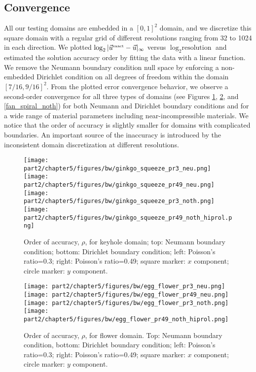 \subsection{Convergence} \label{subsec:ch5.examples.convergence}

All our testing domains are embedded in a $[0,1]^2$ domain, and we discretize this square domain with a regular grid of different resolutions ranging from 32 to 1024 in each direction. We plotted $\log_2 |\vec u^{\mbox{\tiny{exact}}}-\vec u|_{\infty}$ versus $\log_2 \mbox{resolution}$ and estimated the solution accuracy order by fitting the data with a linear function. We remove the Neumann boundary condition null space by enforcing a non-embedded Dirichlet condition on all degrees of freedom within the domain $[7/16,9/16]^2$. From the plotted error convergence behavior, we observe a second-order convergence for all three types of domains (see Figures \ref{ginkgo_squeeze_noth}, \ref{egg_flower_noth}, and \ref{fan_spiral_noth}) for both Neumann and Dirichlet boundary conditions and for a wide range of material parameters including near-incompressible materials. We notice that the order of accuracy is slightly smaller for domains with complicated boundaries. An important source of the inaccuracy is introduced by the inconsistent domain discretization at different resolutions.

\begin{figure}[ht]\centering
\texttt{[image: part2/chapter5/figures/bw/ginkgo\_squeeze\_pr3\_neu.png]}
\texttt{[image: part2/chapter5/figures/bw/ginkgo\_squeeze\_pr49\_neu.png]}
\texttt{[image: part2/chapter5/figures/bw/ginkgo\_squeeze\_pr3\_noth.png]}
\texttt{[image: part2/chapter5/figures/bw/ginkgo\_squeeze\_pr49\_noth\_hiprol.png]}
\vspace*{-.05in}
\caption{Order of accuracy, $\rho$, for keyhole domain; top: Neumann boundary condition; bottom: Dirichlet boundary condition; left: Poisson's ratio=0.3; right: Poisson's ratio=0.49; square marker: $x$ component; circle marker: $y$ component. }
\vspace*{-.07in}
\label{ginkgo_squeeze_noth}
\end{figure}

\begin{figure}[h!]\centering
\texttt{[image: part2/chapter5/figures/bw/egg\_flower\_pr3\_neu.png]}
\texttt{[image: part2/chapter5/figures/bw/egg\_flower\_pr49\_neu.png]}
\texttt{[image: part2/chapter5/figures/bw/egg\_flower\_pr3\_noth.png]}
\texttt{[image: part2/chapter5/figures/bw/egg\_flower\_pr49\_noth\_hiprol.png]}
\vspace*{-.05in}
\caption{Order of accuracy, $\rho$, for flower domain. Top: Neumann boundary condition, bottom: Dirichlet boundary condition; left: Poisson's ratio=0.3; right: Poisson's ratio=0.49; square marker: $x$ component; circle marker: $y$ component. }
\vspace*{-.07in}
\label{egg_flower_noth}
\end{figure}

